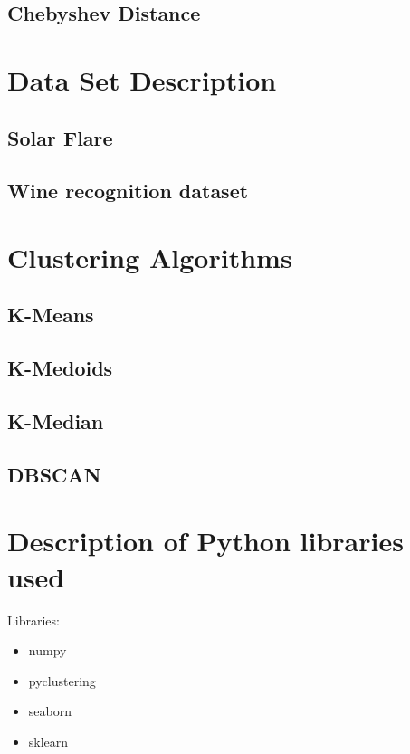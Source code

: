 \documentclass[12pt]%
{article}
\begin{document}
\subsection{Chebyshev Distance}


\section{Data Set Description}

\subsection{Solar Flare}

\subsection{Wine recognition dataset}


\section{Clustering Algorithms}
\subsection{K-Means}
\subsection{K-Medoids}

\subsection{K-Median}
\subsection{DBSCAN}



\section{Description of Python libraries used}
Libraries:
\begin{itemize}
\item numpy 
\item pyclustering
\item seaborn
\item sklearn
%

\end{itemize}
\end{document}
